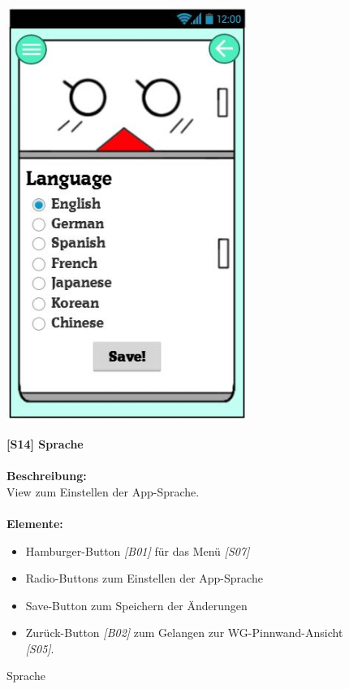\documentclass[a4paper]{scrreprt}
\begin{document}
    	\begin{figure}[h!]
    		\begin{minipage}[t]{0.37\linewidth}
    			\flushright
    			\centering
    			\vspace{1mm}
    			\includegraphics[width=0.7\textwidth]{fridget_language.JPG}
    			\caption{Sprache}
    			\label{fig:figure1}
    			\vspace{15mm}
    		\end{minipage}
    		\hspace{0.5cm}
    		\begin{minipage}[t]{0.6\linewidth}
    			\flushleft
    			\textbf{{[}S14{]} Sprache} \\
    			\hfill
    			\\
    			\textbf{Beschreibung:} \\
    			View zum Einstellen der App-Sprache.\\
    			
    			\hfill
    			\\\textbf{Elemente:}\\
    			\begin{itemize}
    				\renewcommand\labelitemi{--}
    				\item Hamburger-Button \textit{{[}B01{]}} für das Menü \textit{{[}S07{]}}
    				\item Radio-Buttons zum Einstellen der App-Sprache
    				\item Save-Button zum Speichern der Änderungen
    				\item Zurück-Button \textit{{[}B02{]}} zum Gelangen zur
    				WG-Pinnwand-Ansicht \textit{{[}S05{]}}.
    				

\end{itemize}
\end{minipage}
\end{figure}
\end{document}
